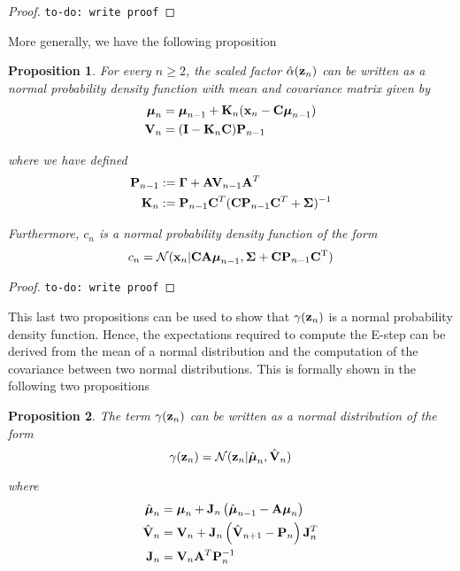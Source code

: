 \documentclass[11pt]{article}
\newtheorem{proposition}{Proposition}[section]
\begin{document}
\begin{proof}
	\texttt{to-do: write proof}
\end{proof}

More generally, we have the following proposition

\begin{proposition}
	For every $n \geq 2$, the scaled factor $\hat\alpha({\bf z}_n)$ can be written as a normal probability density function with mean and covariance matrix given by
	\begin{align}
		\boldsymbol{\mu}_n &= \boldsymbol{\mu}_{n-1} + {\bf K}_n({\bf x}_n -{\bf C}\boldsymbol\mu_{n-1})\\
		{\bf V}_n &=  ({\bf I} - {\bf K}_n{\bf C}){\bf P}_{n-1}
	\end{align}
	
	where we have defined
	\begin{align}
		{\bf P}_{n-1} &:= \boldsymbol{\Gamma} + {\bf A}{\bf V}_{n-1}{\bf A}^T\\
		{\bf K}_n &:= {\bf P}_{n-1}{\bf C}^T({\bf C} {\bf P}_{n-1}{\bf C}^T + \boldsymbol\Sigma)^{-1}
	\end{align}
	
	Furthermore, $c_n$ is a normal probability density function of the form
	\begin{equation}
		c_n = \mathcal{N}({\bf x}_n \vert {\bf CA}\boldsymbol\mu_{n-1}, \boldsymbol\Sigma + {\bf C P}_{n-1}{\bf C}^\text{T})
	\end{equation}
\end{proposition}

\begin{proof}
	\texttt{to-do: write proof}
\end{proof}


This last two propositions can be used to show that $\gamma({\bf z}_n)$ is a normal probability density function. Hence, the expectations required to compute the E-step can be derived from the mean of a normal distribution and the computation of the covariance between two normal distributions. This is formally shown in the following two propositions


\begin{proposition}
	The term $\gamma({\bf z}_n)$ can be written as a normal distribution of the form
	\begin{equation}
		\gamma({\bf z}_n) = \mathcal{N}({\bf z}_n\vert \hat{\boldsymbol\mu}_n, \hat{\bf V}_n)
	\end{equation}
	
	where
	\begin{align}
		\hat{\boldsymbol{\mu}}_n &= \boldsymbol{\mu}_n + {\bf J}_n\left(\hat{\boldsymbol \mu}_{n-1} - {\bf A}\boldsymbol\mu_n\right)\\
		\hat{\bf V}_n &= {\bf V}_n + {\bf J}_n\left(\hat{\bf V}_{n+1} - {\bf P}_n\right){\bf J}_n^T\\
		{\bf J}_n &= {\bf V}_n{\bf A}^T{\bf P}_n^{-1}
	\end{align}
\end{proposition}
\end{document}
